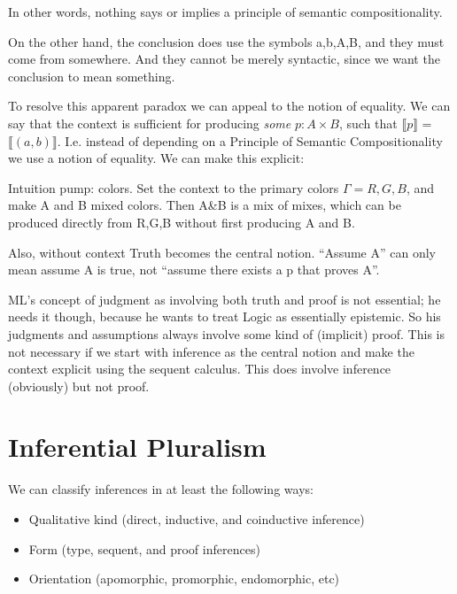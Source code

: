 \documentclass{article}
\begin{document}
In other words, nothing says or implies a principle of semantic
compositionality.

On the other hand, the conclusion does use the symbols a,b,A,B, and
they must come from somewhere. And they cannot be merely syntactic,
since we want the conclusion to mean something.

To resolve this apparent paradox we can appeal to the notion of
equality. We can say that the context is sufficient for producing
\textit{some} \(p:A\times B\), such that \(\llbracket p\rrbracket\) =
\(\llbracket(a,b)\rrbracket\). I.e. instead of depending on a
Principle of Semantic Compositionality we use a notion of equality. We
can make this explicit:


Intuition pump: colors. Set the context to the primary colors \(\Gamma
= R,G,B\), and make A and B mixed colors. Then A\&B is a mix of mixes,
which can be produced directly from R,G,B without first producing A and
B.

Also, without context Truth becomes the central notion. ``Assume A''
can only mean assume A is true, not ``assume there exists a p that
proves A''.

ML's concept of judgment as involving both truth and proof is not
essential; he needs it though, because he wants to treat Logic as
essentially epistemic. So his judgments and assumptions always involve
some kind of (implicit) proof. This is not necessary if we start with
inference as the central notion and make the context explicit using
the sequent calculus. This does involve inference (obviously) but not
proof.

\section{Inferential Pluralism}

We can classify inferences in at least the following ways:
\begin{itemize}
\item Qualitative kind (direct, inductive, and coinductive inference)
\item Form (type, sequent, and proof inferences)
\item Orientation (apomorphic, promorphic, endomorphic, etc)
\end{itemize}
\end{document}
